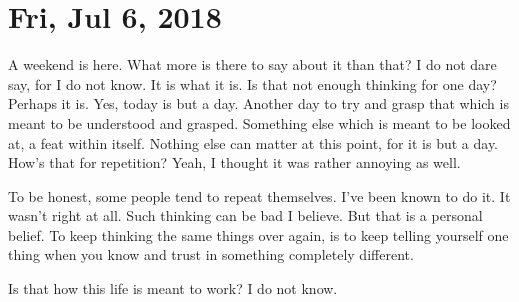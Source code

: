 \section{Fri, Jul 6, 2018}

A weekend is here. What more is there to say about it than that? I do not dare
say, for I do not know. It is what it is. Is that not enough thinking for one
day? Perhaps it is. Yes, today is but a day. Another day to try and grasp that
which is meant to be understood and grasped. Something else which is meant to be
looked at, a feat within itself. Nothing else can matter at this point, for it
is but a day. How's that for repetition? Yeah, I thought it was rather annoying
as well.

To be honest, some people tend to repeat themselves. I've been known to do it.
It wasn't right at all. Such thinking can be bad I believe. But that is a
personal belief. To keep thinking the same things over again, is to keep telling
yourself one thing when you know and trust in something completely different.

Is that how this life is meant to work? I do not know.